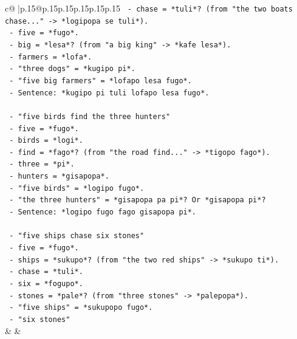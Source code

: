 \documentclass{article}
\begin{document}
{\begin{supertabular}{c@{$\;$}|p{.15\linewidth}@{}p{.15\linewidth}p{.15\linewidth}p{.15\linewidth}p{.15\linewidth}p{.15\linewidth}}
{{{\texttt{                {-} chase = *tuli*? (from "the two boats chase..." {-}> *logipopa se tuli*).} \\
\texttt{                {-} five = *fugo*.} \\
\texttt{                {-} big = *lesa*? (from "a big king" {-}> *kafe lesa*).} \\
\texttt{                {-} farmers = *lofa*.} \\
\texttt{                {-} "three dogs" = *kugipo pi*.} \\
\texttt{                {-} "five big farmers" = *lofapo lesa fugo*.} \\
\texttt{                {-} Sentence: *kugipo pi tuli lofapo lesa fugo*.} \\
\\ 
\texttt{              {-} "five birds find the three hunters"} \\
\texttt{                {-} five = *fugo*.} \\
\texttt{                {-} birds = *logi*.} \\
\texttt{                {-} find = *fago*? (from "the road find..." {-}> *tigopo fago*).} \\
\texttt{                {-} three = *pi*.} \\
\texttt{                {-} hunters = *gisapopa*.} \\
\texttt{                {-} "five birds" = *logipo fugo*.} \\
\texttt{                {-} "the three hunters" = *gisapopa pa pi*? Or *gisapopa pi*?} \\
\texttt{                {-} Sentence: *logipo fugo fago gisapopa pi*.} \\
\\ 
\texttt{              {-} "five ships chase six stones"} \\
\texttt{                {-} five = *fugo*.} \\
\texttt{                {-} ships = *sukupo*? (from "the two red ships" {-}> *sukupo ti*).} \\
\texttt{                {-} chase = *tuli*.} \\
\texttt{                {-} six = *fogupo*.} \\
\texttt{                {-} stones = *pale*? (from "three stones" {-}> *palepopa*).} \\
\texttt{                {-} "five ships" = *sukupopo fugo*.} \\
\texttt{                {-} "six stones"} \\
            }
        }
    }
    & & \\ \\


\end{supertabular}}
\end{document}
